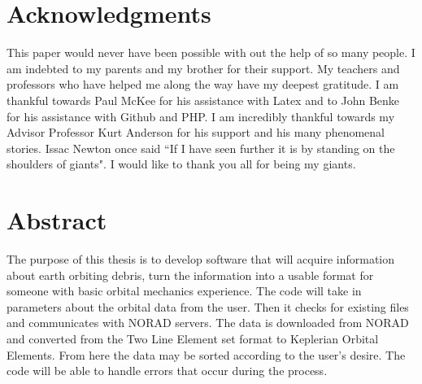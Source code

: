 \documentclass[12pt]{article}
\begin{document}
	\newpage
		\doublespacing
	\section{Acknowledgments}
	

	This paper would never have been possible with out the help of so many people. I am indebted to my parents and my brother for their support. My teachers and professors who have helped me along the way have my deepest gratitude. I am thankful towards Paul McKee for his assistance with Latex and to John Benke for his assistance with Github and PHP. I am incredibly thankful towards my Advisor Professor Kurt Anderson for his support and his many phenomenal stories. Issac Newton once said ``If I have seen further it is by standing on the shoulders of giants"\cite{newtLettr}. I would like to thank you all for being my giants.
	
	
	
	

	
	
	\newpage
	\section{Abstract}
	The purpose of this thesis is to develop software that will acquire information about earth orbiting debris, turn the information into a usable format for someone with basic orbital mechanics experience. The code will take in parameters about the orbital data from the user. Then it checks for existing files and communicates with NORAD servers. The data is downloaded from NORAD and converted from the Two Line Element set format to Keplerian Orbital Elements. From here the data may be sorted according to the user's desire. The code will be able to handle errors that occur during the process.

	\newpage
\end{document}
